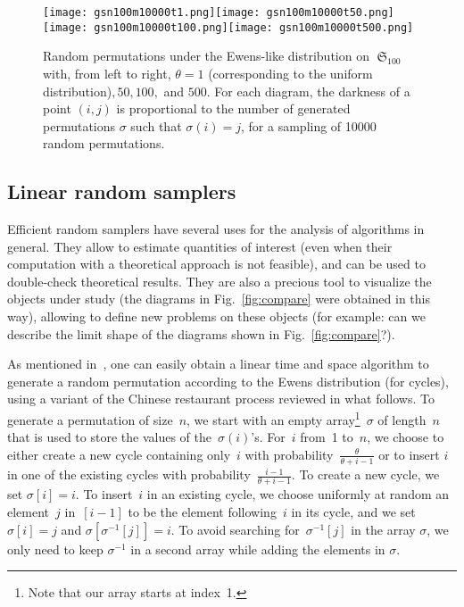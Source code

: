 \documentclass[proceedings]{aofa}
\DeclareMathOperator{\sym}{\mathfrak{S}}
\begin{document}
\begin{figure}[ht]
\texttt{[image: gsn100m10000t1.png]}\texttt{[image: gsn100m10000t50.png]}\texttt{[image: gsn100m10000t100.png]}\texttt{[image: gsn100m10000t500.png]}
\caption{Random permutations under the Ewens-like distribution on $\sym_{100}$ with, from left to right, $\theta=1$ (corresponding to the uniform distribution)$,50,100,$ and $500$. For each diagram,  the darkness of a point $(i,j)$ is proportional 
to the number of generated permutations $\sigma$ such that $\sigma(i)=j$, for a sampling of 10000 random permutations.\label{fig:Ewens}}
\end{figure}

\subsection{Linear random samplers}
Efficient random samplers have several uses for the analysis of algorithms in general. 
They allow to estimate quantities of interest (even when their computation with a theoretical approach is not feasible), 
and can be used to double-check theoretical results. 
They are also a precious tool to visualize the objects under study (the diagrams in Fig.~\ref{fig:compare} were obtained in this way), 
allowing to define new problems on these objects (for example: can we describe the limit shape of the diagrams shown in Fig.~\ref{fig:compare}?).

As mentioned in~\cite[\S 2.1]{Valentin}, one can easily obtain a linear time and space algorithm to generate a random permutation according to the Ewens distribution (for cycles), using a variant of the Chinese restaurant process reviewed in what follows. 
To generate a permutation of size~$n$, we start with an empty array\footnote{Note that our array starts at index~1.}~$\sigma$ of length~$n$ that is used to store the values of the~$\sigma(i)$'s. For~$i$ from~1 to~$n$, we choose to either create a new cycle containing only~$i$ with probability~$\frac{\theta}{\theta + i-1}$ or to insert $i$ in one of the existing cycles with probability~$\frac{i-1}{\theta + i-1}$. To create a new cycle, we set $\sigma[i]=i$. To insert~$i$ in an existing cycle, we choose uniformly at random an element~$j$ in~$[i-1]$ to be the element following~$i$ in its cycle, and we set $\sigma[i]=j$ and $\sigma[\sigma^{-1}[j]]=i$. To avoid searching for~$\sigma^{-1}[j]$ in the array $\sigma$, we only need to keep $\sigma^{-1}$ in a second array while adding the elements in $\sigma$.
\end{document}
